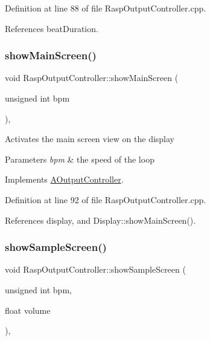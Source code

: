Definition at line 88 of file Rasp\+Output\+Controller.\+cpp.



References beat\+Duration.

\mbox{\label{class_rasp_output_controller_ad195a3d664b7c7e5680cd8949203c1fc}} 
\subsubsection{\texorpdfstring{show\+Main\+Screen()}{showMainScreen()}}
{\footnotesize\ttfamily void Rasp\+Output\+Controller\+::show\+Main\+Screen (\begin{DoxyParamCaption}\item[{unsigned int}]{bpm }\end{DoxyParamCaption})\hspace{0.3cm}{\ttfamily [override]}, {\ttfamily [virtual]}}

Activates the main screen view on the display 
\begin{DoxyParams}{Parameters}
{\em bpm} & the speed of the loop \\
\hline
\end{DoxyParams}


Implements \hyperlink{class_a_output_controller_ace7df9de71110b3615156b9bd06a9349}{A\+Output\+Controller}.



Definition at line 92 of file Rasp\+Output\+Controller.\+cpp.



References display, and Display\+::show\+Main\+Screen().

\mbox{\label{class_rasp_output_controller_a613d3a1d1ceb31875be95e4a4b733fba}} 
\subsubsection{\texorpdfstring{show\+Sample\+Screen()}{showSampleScreen()}}
{\footnotesize\ttfamily void Rasp\+Output\+Controller\+::show\+Sample\+Screen (\begin{DoxyParamCaption}\item[{unsigned int}]{bpm,  }\item[{float}]{volume }\end{DoxyParamCaption})\hspace{0.3cm}{\ttfamily [override]}, {\ttfamily [virtual]}}


